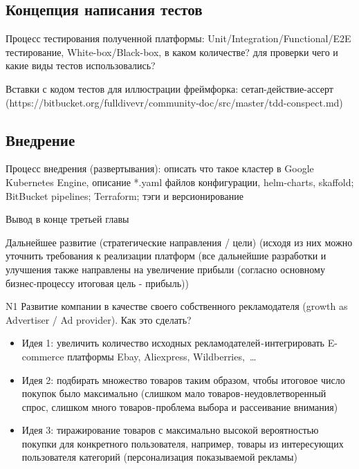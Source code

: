 \documentclass[times]{itmo-student-thesis}
\begin{document}
\subsection{Концепция написания тестов}

Процесс тестирования полученной платформы: Unit/Integration/Functional/E2E тестирование, White-box/Black-box, в каком количестве? для проверки чего и какие виды тестов использовались?

Вставки с кодом тестов для иллюстрации фреймфорка: сетап-действие-ассерт (https://bitbucket.org/fulldivevr/community-doc/src/master/tdd-conspect.md)

\subsection{Внедрение}

Процесс внедрения (развертывания): описать что такое кластер в Google Kubernetes Engine, описание *.yaml файлов конфигурации, helm-charts, skaffold; BitBucket pipelines; Terraform; тэги и версионирование



\chapterconclusion

Вывод в конце третьей главы

\startconclusionpage

Дальнейшее развитие (стратегические направления / цели) (исходя из них можно уточнить требования к реализации платформ
(все дальнейшие разработки и улучшения также направлены на увеличение прибыли (согласно основному бизнес-процессу итоговая цель - прибыль))

N1 Развитие компании в качестве своего собственного рекламодателя (growth as Advertiser / Ad provider). Как это сделать?
\begin{itemize}
\item Идея 1: увеличить количество исходных рекламодателей - интегрировать E-commerce платформы Ebay, Aliexpress, Wildberries, …
\item Идея 2: подбирать множество товаров таким образом, чтобы итоговое число покупок было максимально (слишком мало товаров - неудовлетворенный спрос, слишком много товаров - проблема выбора и рассеивание внимания)
\item Идея 3: тиражирование товаров с максимально высокой вероятностью покупки для конкретного пользователя, например, товары из интересующих пользователя категорий (персонализация показываемой рекламы)
\end{itemize}
\end{document}
